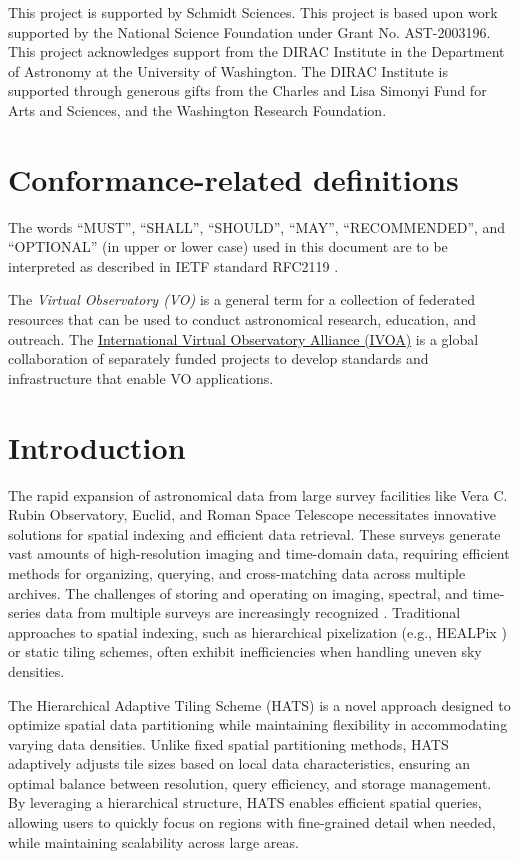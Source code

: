 \documentclass[11pt,a4paper]{ivoa}
\begin{document}
This project is supported by Schmidt Sciences.
This project is based upon work supported by the National Science Foundation under Grant No. AST-2003196.
This project acknowledges support from the DIRAC Institute in the Department of Astronomy at the University of Washington. The DIRAC Institute is supported through generous gifts from the Charles and Lisa Simonyi Fund for Arts and Sciences, and the Washington Research Foundation.


\section*{Conformance-related definitions}
The words ``MUST'', ``SHALL'', ``SHOULD'', ``MAY'', ``RECOMMENDED'', and
``OPTIONAL'' (in upper or lower case) used in this document are to be
interpreted as described in IETF standard RFC2119 \citep{std:RFC2119}.

The \emph{Virtual Observatory (VO)} is a
general term for a collection of federated resources that can be used
to conduct astronomical research, education, and outreach.
The \href{https://www.ivoa.net}{International
Virtual Observatory Alliance (IVOA)} is a global
collaboration of separately funded projects to develop standards and
infrastructure that enable VO applications.

\section{Introduction}
The rapid expansion of astronomical data from large survey facilities like Vera C. Rubin Observatory, Euclid, and Roman Space Telescope necessitates innovative solutions for spatial indexing and efficient data retrieval. 
These surveys generate vast amounts of high-resolution imaging and time-domain data, requiring efficient methods for organizing, querying, and cross-matching data across multiple archives. The challenges of storing and operating on imaging, spectral, and time-series data from multiple surveys are increasingly recognized \citep{Nadvornik2021}. 
Traditional approaches to spatial indexing, such as hierarchical pixelization (e.g., HEALPix  \cite{gorski:healpix}) or static tiling schemes, often exhibit inefficiencies when handling uneven sky densities. 

The Hierarchical Adaptive Tiling Scheme (HATS) is a novel approach designed to optimize spatial data partitioning while maintaining flexibility in accommodating varying data densities. 
Unlike fixed spatial partitioning methods, HATS adaptively adjusts tile sizes based on local data characteristics, ensuring an optimal balance between resolution, query efficiency, and storage management. 
By leveraging a hierarchical structure, HATS enables efficient spatial queries, allowing users to quickly focus on regions with fine-grained detail when needed, while maintaining scalability across large areas.
\end{document}
